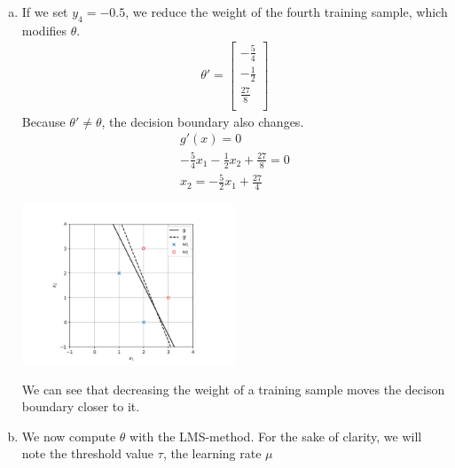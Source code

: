 \documentclass[a4paper, 10pt, twoside]{article}
\begin{document}
\begin{enumerate}[a)]
    \item If we set $y_4=-0.5$, we reduce the weight of the fourth training sample, which modifies $\theta$.
          \begin{align*}
              \theta' =
              \begin{bmatrix}
                  -\frac{5}{4} \\
                  -\frac{1}{2} \\
                  \frac{27}{8} \\
              \end{bmatrix}
          \end{align*}
          Because $\theta' \neq \theta$, the decision boundary also changes.
          \begin{align*}
              g'(x) = 0                                             \\
              -\frac{5}{4} x_1 - \frac{1}{2} x_2 + \frac{27}{8} = 0 \\
              x_2 = -\frac{5}{2} x_1 + \frac{27}{4}
          \end{align*}
          \begin{center}
              \includegraphics[width=0.5\textwidth]{graph3.png}
          \end{center}
          We can see that decreasing the weight of a training sample moves the decison boundary closer to it.

    \item We now compute $\theta$ with the LMS-method. For the sake of clarity, we will note the threshold value $\tau$, the learning rate $\mu$
\end{enumerate}
\end{document}

